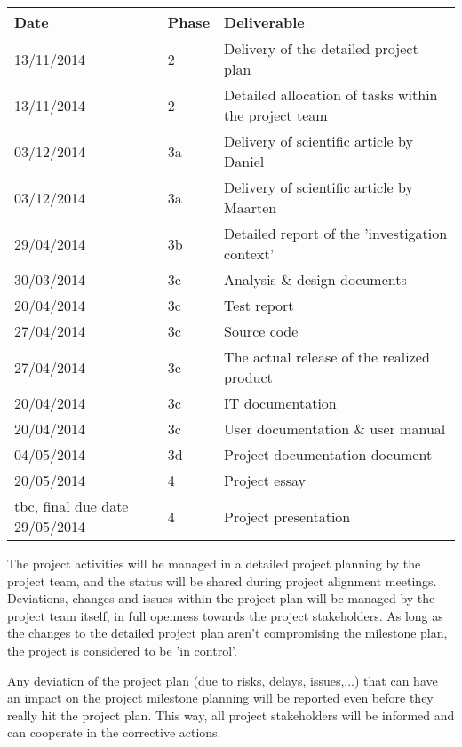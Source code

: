 \begin{center}
    \begin{tabular}{ | l | l |  p{10cm} |}
    \hline
    	Date & Phase & Deliverable \\ 
    \hline
    	13/11/2014 & 2 & Delivery of the detailed project plan \\ 
    \hline
    	13/11/2014 & 2 & Detailed allocation of tasks within the project team \\ 
    \hline
    	03/12/2014 & 3a & Delivery of scientific article by Daniel\\ 
    \hline
    	03/12/2014 & 3a & Delivery of scientific article by Maarten \\ 
    \hline
    	29/04/2014 & 3b & Detailed report of the 'investigation context'  \\ 
    \hline
  	 30/03/2014 & 3c & Analysis \& design documents \\ 
    \hline
   	20/04/2014 & 3c & Test report \\ 
    \hline
  	27/04/2014 & 3c & Source code \\ 
    \hline
  	27/04/2014 & 3c & The actual release of the realized product \\ 
    \hline
  	20/04/2014 & 3c &  IT documentation   \\ 
    \hline
  	20/04/2014 & 3c & User documentation \& user manual  \\ 
    \hline
  	04/05/2014 & 3d & Project documentation document \\ 
    \hline
  	20/05/2014 & 4 & Project essay \\ 
    \hline
 	tbc, final due date 29/05/2014 & 4 & Project presentation	 \\ 
    \hline
    \end{tabular}
\end{center}

The project activities will be managed in a detailed project planning by the project team, and the status will be shared during project alignment meetings.
Deviations, changes and issues within the project plan will be managed by the project team itself, in full openness towards the project stakeholders. 
As long as the changes to the detailed project plan aren't  compromising the milestone plan, the project is considered to be 'in control'. 

Any deviation of the project plan (due to risks, delays, issues,...) that can have an impact on the project milestone planning will be reported even before they really hit the project plan. 
This way, all project stakeholders will be informed and can cooperate in the corrective actions.




